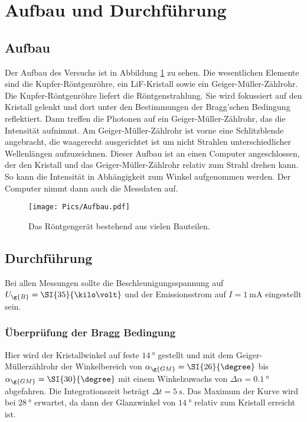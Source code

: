 \section{Aufbau und Durchführung}
\label{sec:Durchführung}

\subsection{Aufbau}
Der Aufbau des Versuchs ist in Abbildung \ref{fig:aufbau} zu sehen. Die wesentlichen
Elemente sind die Kupfer-Röntgenröhre, ein LiF-Kristall sowie ein Geiger-Müller-Zählrohr.
Die Kupfer-Röntgenröhre liefert die Röntgenstrahlung. Sie wird fokussiert auf den Kristall
gelenkt und dort unter den Bestimmungen der Bragg'schen Bedingung reflektiert. Dann
treffen die Photonen auf ein Geiger-Müller-Zählrohr, das die Intensität aufnimmt.
Am Geiger-Müller-Zählrohr ist vorne eine Schlitzblende angebracht, die waagerecht ausgerichtet
ist um nicht Strahlen unterschiedlicher Wellenlängen aufzuzeichnen.
Dieser Aufbau ist an einen Computer angeschlossen, der den Kristall und das Geiger-Müller-Zählrohr
relativ zum Strahl drehen kann. So kann die Intensität in Abhängigkeit zum Winkel
aufgenommen werden. Der Computer nimmt dann auch die Messdaten auf.

\begin{figure}
  \centering
  \texttt{[image: Pics/Aufbau.pdf]}
  \caption{Das Röntgengerät bestehend aus vielen Bauteilen. \cite{anleitung}}
  \label{fig:aufbau}
\end{figure}

\subsection{Durchführung}

Bei allen Messungen sollte die Beschleunigungsspannung auf
$U_{\g{B}} = \SI{35}{\kilo\volt}$ und der Emissionsstrom auf $I = \SI{1}{\milli\ampere}$
eingestellt sein.

\subsubsection{Überprüfung der Bragg Bedingung}

Hier wird der Kristallwinkel auf feste $\SI{14}{\degree}$ gestellt und mit dem
Geiger-Müllerzählrohr der Winkelbereich von $\alpha_{\g{GM}} = \SI{26}{\degree}$
bis $\alpha_{\g{GM}} = \SI{30}{\degree}$ mit einem Winkelzuwachs von
$\Delta \alpha = \SI{0.1}{\degree}$ abgefahren. Die Integrationszeit beträgt
$\Delta t = \SI{5}{\second}$. Das Maximum der Kurve wird bei $\SI{28}{\degree}$
erwartet, da dann der Glanzwinkel von $\SI{14}{\degree}$ relativ zum Kristall erreicht ist.

